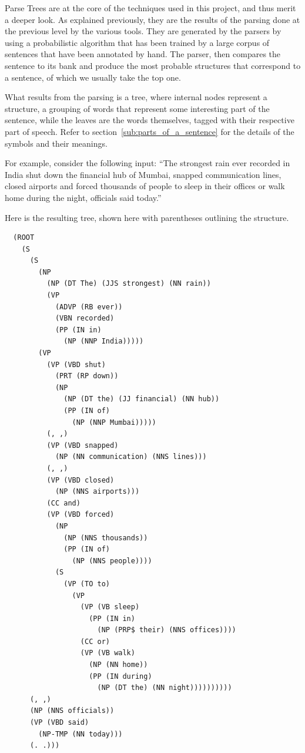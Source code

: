 Parse Trees are at the core of the techniques used in this project, and thus merit a deeper look. As explained previously, they are the results of the parsing done at the previous level by the various tools. They are generated by the parsers by using a probabilistic algorithm that has been trained by a large corpus of sentences that have been annotated by hand. The parser, then compares the sentence to its bank and produce the most probable structures that correspond to a sentence, of which we usually take the top one.

What results from the parsing is a tree, where internal nodes represent a structure, a grouping of words that represent some interesting part of the sentence, while the leaves are the words themselves, tagged with their respective part of speech. Refer to section~\ref{sub:parts_of_a_sentence} for the details of the symbols and their meanings.

For example, consider the following input: ``The strongest rain ever recorded in India shut down the financial hub of Mumbai, snapped communication lines, closed airports and forced thousands of people to sleep in their offices or walk home during the night, officials said today.''

Here is the resulting tree, shown here with parentheses outlining the structure.
\begin{verbatim}
  (ROOT
    (S
      (S
        (NP
          (NP (DT The) (JJS strongest) (NN rain))
          (VP
            (ADVP (RB ever))
            (VBN recorded)
            (PP (IN in)
              (NP (NNP India)))))
        (VP
          (VP (VBD shut)
            (PRT (RP down))
            (NP
              (NP (DT the) (JJ financial) (NN hub))
              (PP (IN of)
                (NP (NNP Mumbai)))))
          (, ,)
          (VP (VBD snapped)
            (NP (NN communication) (NNS lines)))
          (, ,)
          (VP (VBD closed)
            (NP (NNS airports)))
          (CC and)
          (VP (VBD forced)
            (NP
              (NP (NNS thousands))
              (PP (IN of)
                (NP (NNS people))))
            (S
              (VP (TO to)
                (VP
                  (VP (VB sleep)
                    (PP (IN in)
                      (NP (PRP$ their) (NNS offices))))
                  (CC or)
                  (VP (VB walk)
                    (NP (NN home))
                    (PP (IN during)
                      (NP (DT the) (NN night))))))))))
      (, ,)
      (NP (NNS officials))
      (VP (VBD said)
        (NP-TMP (NN today)))
      (. .)))
\end{verbatim}

